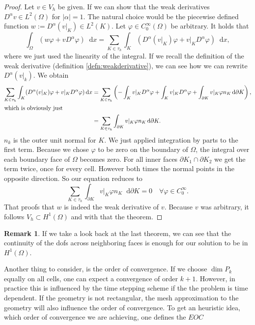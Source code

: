 \documentclass[12pt,a4paper,twoside, open=right]{scrreprt}
\theoremstyle{definition}
\newtheorem{rem}[auf]{Remark}
\theoremstyle{plain}
\newcommand{\abs}[1]{\left\vert #1\right\vert}
\newcommand{\D}{\mathop{}\!\mathrm{d}}
\begin{document}
\begin{proof}
    Let $v\in V_h$ be given. If we can show that the weak derivatives $D^\alpha v\in L^2(\Omega)$ for $\abs{\alpha}=1$. The natural choice would be the piecewise defined function $w:=D^\alpha(v\vert_K)\in L^2(K)$. Let $\varphi\in C^\infty_0(\Omega)$ be arbitrary. It holds that 
    \begin{equation}
        \int_\Omega(w\varphi+vD^\alpha \varphi)\D x = \sum_{K\in\tau_h}\int_K(D^\alpha(v\vert_K)\varphi+v\vert_K D^\alpha\varphi)\D x,
    \end{equation}
    where we just used the linearity of the integral. If we recall the definition of the weak derivative (definition \ref{defn:weakderivative}), we can see how we can rewrite $D^\alpha(v\vert_k)$. We obtain
    \begin{align}
        \sum_{K\in\tau_h}\int_K(D^\alpha(v\vert_K)\varphi+v\vert_K D^\alpha\varphi)\D x&=\sum_{K\in\tau_h}\left(-\int_K v\vert_KD^\alpha\varphi+\int_K v\vert_K D^\alpha\varphi +\int_{\partial K}v\vert_K\varphi n_K\D\partial K\right),\\\intertext{which is obviously just}& =\sum_{K\in\tau_h}\int_{\partial K}v\vert_K\varphi n_K\D\partial K.
    \end{align}
    $n_k$ is the outer unit normal for $K$. We just applied integration by parts to the first term. Because we chose $\varphi$ to be zero on the boundary of $\Omega$, the integral over each boundary face of $\Omega$ becomes zero. For all inner faces $\partial K_1\cap \partial K_2$ we get the term twice, once for every cell. However both times the normal points in the opposite direction. So our equation reduces to 
    \begin{equation}
        \sum_{K\in\tau_h}\int_{\partial K}v\vert_K\varphi n_K\D\partial K=0 \quad \forall\varphi\in C^\infty_0.
    \end{equation}
    That proofs that $w$ is indeed the weak derivative of $v$. Because $v$ was arbitrary, it follows $V_h\subset H^1(\Omega)$ and with that the theorem.
\end{proof}
\begin{rem}
    If we take a look back at the last theorem, we can see that the continuity of the dofs across neighboring faces is enough for our solution to be in $H^1(\Omega)$. 
\end{rem}
Another thing to consider, is the order of convergence. If we choose $\dim P_k$ equally on all cells, one can expect a convergence of order $k+1$. However, in practice this is influenced by the time stepping scheme if the the problem is time dependent. If the geometry is not rectangular, the mesh approximation to the geometry will also influence the order of convergence. To get an heuristic idea, which order of convergence we are achieving, one defines the $EOC$
\end{document}
